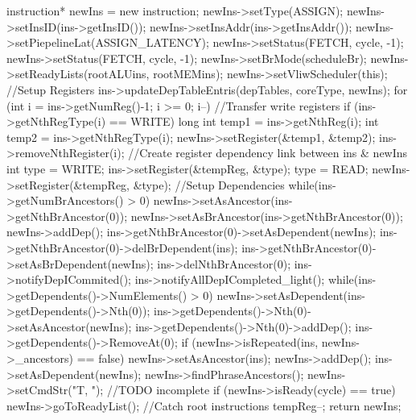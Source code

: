 \begin{DoxyCode}
                                                                   {
        instruction* newIns = new instruction;
        newIns->setType(ASSIGN);
        newIns->setInsID(ins->getInsID());
        newIns->setInsAddr(ins->getInsAddr());
        newIns->setPiepelineLat(ASSIGN_LATENCY);
        newIns->setStatus(FETCH, cycle, -1);
        newIns->setStatus(FETCH, cycle, -1);
        newIns->setBrMode(scheduleBr);
        newIns->setReadyLists(rootALUins, rootMEMins);
        newIns->setVliwScheduler(this);
        //Setup Registers
        ins->updateDepTableEntris(depTables, coreType, newIns);
        for (int i = ins->getNumReg()-1; i >= 0; i--) {
                //Transfer write registers
                if (ins->getNthRegType(i) == WRITE) {
                        long int temp1 = ins->getNthReg(i);
                        int temp2 = ins->getNthRegType(i);
                        newIns->setRegister(&temp1, &temp2);
                        ins->removeNthRegister(i);
                }
                //Create register dependency link between ins & newIns 
                int type = WRITE;
                ins->setRegister(&tempReg, &type);
                type = READ;
                newIns->setRegister(&tempReg, &type);
        }
        //Setup Dependencies
        while(ins->getNumBrAncestors() > 0) {
                newIns->setAsAncestor(ins->getNthBrAncestor(0));
                newIns->setAsBrAncestor(ins->getNthBrAncestor(0));
                newIns->addDep();
                ins->getNthBrAncestor(0)->setAsDependent(newIns);
                ins->getNthBrAncestor(0)->delBrDependent(ins);
                ins->getNthBrAncestor(0)->setAsBrDependent(newIns);
                ins->delNthBrAncestor(0);
        }
        ins->notifyDepICommited();
        ins->notifyAllDepICompleted_light();
        while(ins->getDependents()->NumElements() > 0) {
                newIns->setAsDependent(ins->getDependents()->Nth(0));
                ins->getDependents()->Nth(0)->setAsAncestor(newIns);
                ins->getDependents()->Nth(0)->addDep();
                ins->getDependents()->RemoveAt(0);
        }
        if (newIns->isRepeated(ins, newIns->_ancestors) == false) {
                newIns->setAsAncestor(ins);
                newIns->addDep();
        }
        ins->setAsDependent(newIns);
        newIns->findPhraseAncestors();
        newIns->setCmdStr("T, "); //TODO incomplete
        if (newIns->isReady(cycle) == true) newIns->goToReadyList(); //Catch root
       instructions
        tempReg--;
        return newIns;
}
\end{DoxyCode}


